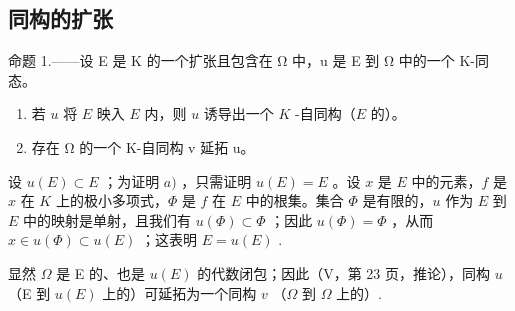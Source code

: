 \subsection{同构的扩张}

命题 1.——设 E 是 K 的一个扩张且包含在 Ω 中，u 是 E 到 Ω 中的一个 K-同态。

\begin{enumerate}
\def\labelenumi{\alph{enumi})}
\item
  若 \(u\) 将 \(E\) 映入 \(E\) 内，则 \(u\) 诱导出一个 \(K\) -自同构（\(E\) 的）。
\item
  存在 Ω 的一个 K-自同构 v 延拓 u。
\end{enumerate}

设 \(u(E) \subset E\) ；为证明 \(a)\) ，只需证明 \(u(E) = E\) 。设 \(x\) 是 \(E\) 中的元素，\(f\) 是 \(x\) 在 \(K\) 上的极小多项式，\(\Phi\) 是 \(f\) 在 \(E\) 中的根集。集合 \(\Phi\) 是有限的，\(u\) 作为 \(E\) 到 \(E\) 中的映射是单射，且我们有 \(u(\Phi) \subset \Phi\) ；因此 \(u(\Phi) = \Phi\) ，从而 \(x \in u(\Phi) \subset u(E)\) ；这表明 \(E = u(E)\) .

显然 \(\Omega\) 是 E 的、也是 \(u(E)\) 的代数闭包；因此（V，第 23 页，推论），同构 \(u\) （E 到 \(u(E)\) 上的）可延拓为一个同构 \(v\) （\(\Omega\) 到 \(\Omega\) 上的）.

